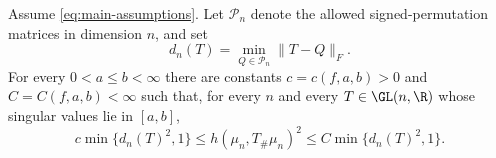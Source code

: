 \begin{theorem}
\label{thm:global-coercivity}
Assume \eqref{eq:main-assumptions}.  Let \(\mathcal P_n\) denote the allowed
signed-permutation matrices in dimension \(n\), and set
\begin{equation}
 d_n(T)=\min_{Q\in\mathcal P_n}\|T-Q\|_F.
 \label{eq:distance-stabilizer}
\end{equation}
For every \(0<a\le b<\infty\)
there are constants \(c=c(f,a,b)>0\) and \(C=C(f,a,b)<\infty\) such
that, for every \(n\) and every \(T\in\GL(n,\R)\) whose singular
values lie in \([a,b]\),
\begin{equation}
 c\min\{d_n(T)^2,1\}
 \le h(\mu_n,T_\#\mu_n)^2
 \le C\min\{d_n(T)^2,1\}.
 \label{eq:global-coercivity}
\end{equation}
\end{theorem}
